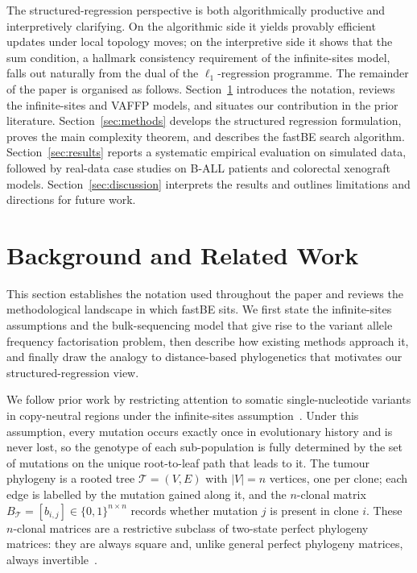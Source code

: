 \documentclass[11pt]{article}
\begin{document}
The structured-regression perspective is both algorithmically productive and interpretively clarifying. On the algorithmic side it yields provably efficient updates under local topology moves; on the interpretive side it shows that the sum condition, a hallmark consistency requirement of the infinite-sites model, falls out naturally from the dual of the $\ell_1$-regression programme. The remainder of the paper is organised as follows. Section~\ref{sec:background} introduces the notation, reviews the infinite-sites and VAFFP models, and situates our contribution in the prior literature. Section~\ref{sec:methods} develops the structured regression formulation, proves the main complexity theorem, and describes the fastBE search algorithm. Section~\ref{sec:results} reports a systematic empirical evaluation on simulated data, followed by real-data case studies on B-ALL patients and colorectal xenograft models. Section~\ref{sec:discussion} interprets the results and outlines limitations and directions for future work.

\section{Background and Related Work}
\label{sec:background}

This section establishes the notation used throughout the paper and reviews the methodological landscape in which fastBE sits. We first state the infinite-sites assumptions and the bulk-sequencing model that give rise to the variant allele frequency factorisation problem, then describe how existing methods approach it, and finally draw the analogy to distance-based phylogenetics that motivates our structured-regression view.

We follow prior work by restricting attention to somatic single-nucleotide variants in copy-neutral regions under the infinite-sites assumption~\citep{elkebir2015reconstruction,deshwar2015phylowgs,popic2015lichee,malikic2015citup,roth2014pyclone,satas2017pastri,myers2019calder,wintersinger2022pairtree}. Under this assumption, every mutation occurs exactly once in evolutionary history and is never lost, so the genotype of each sub-population is fully determined by the set of mutations on the unique root-to-leaf path that leads to it. The tumour phylogeny is a rooted tree $\mathcal{T}=(V,E)$ with $|V|=n$ vertices, one per clone; each edge is labelled by the mutation gained along it, and the $n$-clonal matrix $B_{\mathcal{T}}=[b_{i,j}]\in\{0,1\}^{n\times n}$ records whether mutation $j$ is present in clone $i$. These $n$-clonal matrices are a restrictive subclass of two-state perfect phylogeny matrices: they are always square and, unlike general perfect phylogeny matrices, always invertible~\citep{elkebir2015reconstruction}.
\end{document}
